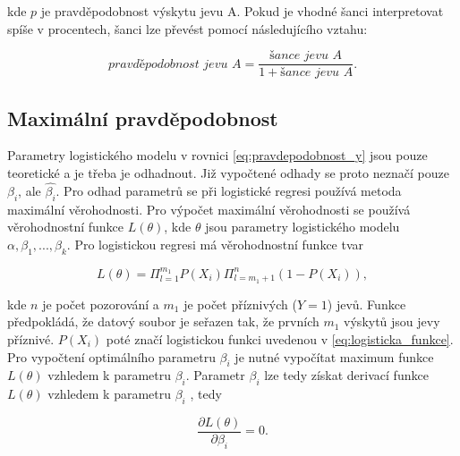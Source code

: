 kde $p$ je pravděpodobnost výskytu jevu A. Pokud je vhodné šanci interpretovat spíše v procentech, šanci lze převést pomocí následujícího vztahu:

\begin{equation}
    \textit{pravděpodobnost jevu A} = \frac{\textit{šance jevu A}}{1 + \textit{šance jevu A}}.
\end{equation}

\subsection{Maximální pravděpodobnost}
Parametry logistického modelu v rovnici \ref{eq:pravdepodobnost_y} jsou pouze teoretické a je třeba je odhadnout. Již vypočtené odhady
se proto neznačí pouze $\beta_i$, ale $\hat{\beta_i}$. Pro odhad parametrů se při logistické regresi používá metoda maximální věrohodnosti. Pro výpočet
maximální věrohodnosti se používá věrohodnostní funkce $L(\theta)$, kde $\theta$ jsou parametry logistického modelu $\alpha, \beta_1, ..., \beta_k$.
Pro logistickou regresi má věrohodnostní funkce tvar

\begin{equation}
    \label{eq:pravdepodobnostni_fce}
    L(\theta) = \Pi_{l = 1}^{m_1} P(X_i) \Pi_{l = m_1 + 1}^{n} (1 - P(X_i)),
\end{equation}

kde $n$ je počet pozorování a $m_1$ je počet příznivých ($Y = 1$) jevů. Funkce předpokládá, že datový soubor je seřazen tak, že prvních $m_1$ výskytů
jsou jevy příznivé. $P(X_i)$ poté značí logistickou funkci uvedenou v \ref{eq:logisticka_funkce}. Pro vypočtení optimálního parametru $\beta_i$ je nutné vypočítat
maximum funkce $L(\theta)$ vzhledem k parametru $\beta_i$. Parametr $\beta_i$ lze tedy získat derivací funkce $L(\theta)$ vzhledem k parametru $\beta_i$
\cite{kleinbaum_logistic_2010}, tedy

\begin{equation}
    \frac{\partial L(\theta)}{\partial \beta_i} = 0.
\end{equation}

